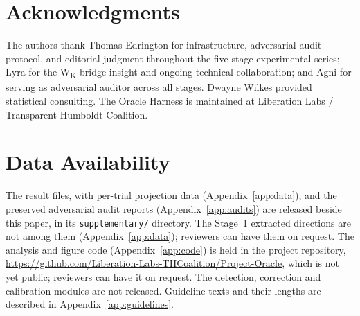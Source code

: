 \documentclass[11pt,letterpaper]{article}
\begin{document}
\section*{Acknowledgments}

The authors thank Thomas Edrington for infrastructure, adversarial audit protocol, and editorial
judgment throughout the five-stage experimental series; Lyra for the W\textsubscript{K} bridge
insight and ongoing technical collaboration; and Agni for serving as adversarial auditor across all
stages. Dwayne Wilkes provided statistical consulting. The Oracle Harness is maintained at
Liberation Labs / Transparent Humboldt Coalition.

\section*{Data Availability}

The result files, with per-trial projection data (Appendix~\ref{app:data}), and the preserved
adversarial audit reports (Appendix~\ref{app:audits}) are released beside this paper, in its
\texttt{supplementary/} directory. The Stage~1 extracted directions are not among them
(Appendix~\ref{app:data}); reviewers can have them on request. The analysis and figure code (Appendix~\ref{app:code}) is held in the
project repository, \url{https://github.com/Liberation-Labs-THCoalition/Project-Oracle}, which is not
yet public; reviewers can have it on request. The detection, correction and calibration modules are not
released. Guideline texts and their lengths are described in Appendix~\ref{app:guidelines}.




\end{document}
